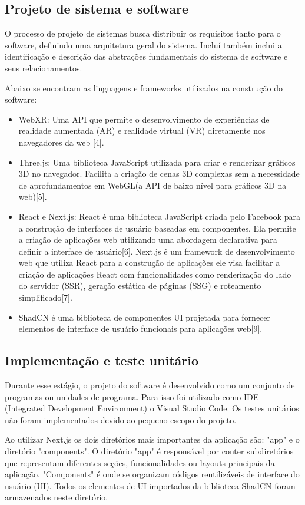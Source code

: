 \documentclass[conference]{IEEEtran}
\begin{document}
\subsection{Projeto de sistema e software}
O processo de projeto de sistemas busca distribuir os requisitos tanto para o
software, definindo uma arquitetura geral do sistema. Incluí também inclui a
identificação e descrição das abstrações fundamentais do sistema de software e
seus relacionamentos.
\par
Abaixo se encontram as linguagens e frameworks utilizados na construção do
software:
\begin{itemize}
  \item WebXR: Uma API que permite o desenvolvimento de experiências de realidade
        aumentada (AR) e realidade virtual (VR) diretamente nos navegadores da web [4].
  \item Three.js: Uma biblioteca JavaScript utilizada para criar e renderizar gráficos
        3D no navegador. Facilita a criação de cenas 3D complexas sem a necessidade de
        aprofundamentos em WebGL(a API de baixo nível para gráficos 3D na web)[5].
  \item React e Next.js: React é uma biblioteca JavaScript criada pelo Facebook para a
        construção de interfaces de usuário baseadas em componentes. Ela permite a
        criação de aplicações web utilizando uma abordagem declarativa para definir a
        interface de usuário[6]. Next.js é um framework de desenvolvimento web que
        utiliza React para a construção de aplicações ele visa facilitar a criação de
        aplicações React com funcionalidades como renderização do lado do servidor
        (SSR), geração estática de páginas (SSG) e roteamento simplificado[7].
  \item ShadCN é uma biblioteca de componentes UI projetada para fornecer elementos de
        interface de usuário funcionais para aplicações web[9].
\end{itemize}

\subsection{Implementação e teste unitário}
Durante esse estágio, o projeto do software é desenvolvido como um conjunto de
programas ou unidades de programa. Para isso foi utilizado como IDE (Integrated
Development Environment) o Visual Studio Code. Os testes unitários não foram
implementados devido ao pequeno escopo do projeto.
\par Ao utilizar Next.js os dois diretórios mais importantes da aplicação são: "app"
e o diretório "components". O diretório "app" é responsável por conter
subdiretórios que representam diferentes seções, funcionalidades ou layouts
principais da aplicação. "Components" é onde se organizam códigos reutilizáveis
de interface do usuário (UI). Todos os elementos de UI importados da biblioteca
ShadCN foram armazenados neste diretório.
\end{document}
